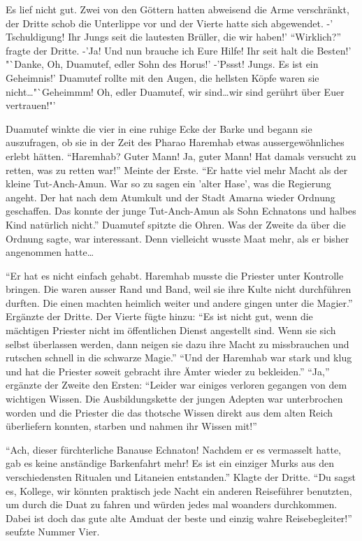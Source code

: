 \documentclass[11pt,titlepage,a5paper]{book}
\begin{document}
Es lief nicht gut. Zwei von den Göttern hatten abweisend die Arme verschränkt, der Dritte schob die Unterlippe vor und der Vierte hatte sich abgewendet. -' Tschuldigung! Ihr Jungs seit die lautesten Brüller, die wir haben!' "`Wirklich?"' fragte der Dritte. -'Ja! Und nun brauche ich Eure Hilfe! Ihr seit halt die Besten!' "`{\Large Danke, Oh, Duamutef, edler Sohn des Horus!'} -'Pssst! Jungs. Es ist ein Geheimnis!' Duamutef rollte mit den Augen, die hellsten Köpfe waren sie nicht\dots {\Large "`Geheimmm! Oh, edler Duamutef, wir sind}\dots {\scriptsize wir sind gerührt über Euer vertrauen!"'}

Duamutef winkte die vier in eine ruhige Ecke der Barke und begann sie auszufragen, ob sie in der Zeit des Pharao Haremhab etwas aussergewöhnliches erlebt hätten. "`Haremhab? Guter Mann! Ja, guter Mann! Hat damals versucht zu retten, was zu retten war!"' Meinte der Erste. "`Er hatte viel mehr Macht als der kleine Tut-Anch-Amun. War so zu sagen ein 'alter Hase', was die Regierung angeht. Der hat nach dem Atumkult und der Stadt Amarna wieder Ordnung geschaffen. Das konnte der junge Tut-Anch-Amun als Sohn Echnatons und halbes Kind natürlich nicht."' Duamutef spitzte die Ohren. Was der Zweite da über die Ordnung sagte, war interessant. Denn vielleicht wusste Maat mehr, als er bisher angenommen hatte\dots 

"`Er hat es nicht einfach gehabt. Haremhab musste die Priester unter Kontrolle bringen. Die waren ausser Rand und Band, weil sie ihre Kulte nicht durchführen durften. Die einen machten heimlich weiter und andere gingen unter die Magier."' Ergänzte der Dritte. Der Vierte fügte hinzu: "`Es ist nicht gut, wenn die mächtigen Priester nicht im öffentlichen Dienst angestellt sind. Wenn sie sich selbst überlassen werden, dann neigen sie dazu ihre Macht zu missbrauchen und rutschen schnell in die schwarze Magie."' "`Und der Haremhab war stark und klug und hat die Priester soweit gebracht ihre Ämter wieder zu bekleiden."' "`Ja,"' ergänzte der Zweite den Ersten: "`Leider war einiges verloren gegangen von dem wichtigen Wissen. Die Ausbildungskette der jungen Adepten war unterbrochen worden und die Priester die das thotsche Wissen direkt aus dem alten Reich überliefern konnten, starben und nahmen ihr Wissen mit!"'

 "`Ach, dieser fürchterliche Banause Echnaton! Nachdem er es vermasselt hatte, gab es keine anständige Barkenfahrt mehr! Es ist ein einziger Murks aus den verschiedensten Ritualen und Litaneien entstanden."' Klagte der Dritte. "`Du sagst es, Kollege, wir könnten praktisch jede Nacht ein anderen Reiseführer benutzten, um durch die Duat zu fahren und würden jedes mal woanders durchkommen. Dabei ist doch das gute alte Amduat der beste und einzig wahre Reisebegleiter!"' seufzte Nummer Vier.  
 
\end{document}
